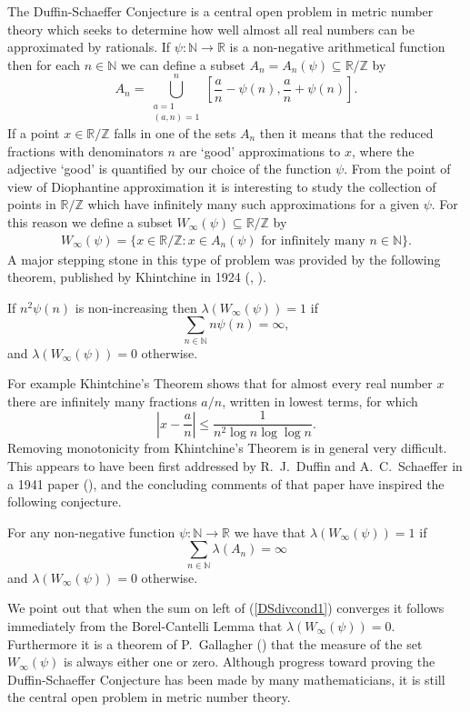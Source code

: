 \documentclass[12pt,reqno]{amsart}
\begin{document}
The Duffin-Schaeffer Conjecture is a central open problem in metric number theory which seeks to determine how well almost all real numbers can be approximated by rationals. If $\psi:{\mathbb{N}}{\rightarrow}{\mathbb{R}}$ is a non-negative arithmetical function then for each $n\in{\mathbb{N}}$ we can define a subset $A_n=A_n(\psi)\subseteq{\mathbb{R}}/{\mathbb{Z}}$ by
\begin{equation*}
A_n=\bigcup_{\substack{a=1\\(a,n)=1}}^n\left[\frac{a}{n}-\psi (n),\frac{a}{n}+\psi (n)\right].
\end{equation*}
If a point $x\in{\mathbb{R}}/{\mathbb{Z}}$ falls in one of the sets $A_n$ then it means that the reduced fractions with denominators $n$ are `good' approximations to $x$, where the adjective `good' is quantified by our choice of the function $\psi$. From the point of view of Diophantine approximation it is interesting to study the collection of points in ${\mathbb{R}}/{\mathbb{Z}}$ which have infinitely many such approximations for a given $\psi$. For this reason we define a subset $W_\infty(\psi)\subseteq{\mathbb{R}}/{\mathbb{Z}}$ by
\begin{align*}
W_\infty(\psi)=\{x\in{\mathbb{R}}/{\mathbb{Z}} :x\in A_n(\psi) \text{ for infinitely many }n\in{\mathbb{N}}\}.
\end{align*}
A major stepping stone in this type of problem was provided by the following theorem, published by Khintchine in 1924 (\cite{Khintchine1924}, \cite{Khintchine1926}).
\begin{KT}
If $n^2\psi(n)$ is non-increasing then $\lambda (W_\infty(\psi))=1$ if
\begin{equation*}
\sum_{n\in{\mathbb{N}}}n\psi (n)=\infty,
\end{equation*}
and $\lambda (W_\infty(\psi))=0$ otherwise.
\end{KT}
For example Khintchine's Theorem shows that for almost every real number $x$ there are infinitely many fractions $a/n$, written in lowest terms, for which
\[\left|x-\frac{a}{n}\right|\le\frac{1}{n^2\log n\log\log n}.\]
Removing monotonicity from Khintchine's Theorem is in general very difficult. This appears to have been first addressed by R.~J.~Duffin and A.~C.~Schaeffer in a 1941 paper (\cite{DuffinSchaeffer}), and the concluding comments of that paper have inspired the following conjecture.
\begin{DSC}
For any non-negative function $\psi:{\mathbb{N}}{\rightarrow}{\mathbb{R}}$ we have that $\lambda (W_\infty (\psi))=1$ if
\begin{equation}\label{DSdivcond1}
\sum_{n\in{\mathbb{N}}}\lambda (A_n)=\infty
\end{equation}
and $\lambda (W_\infty(\psi))=0$ otherwise.
\end{DSC}
We point out that when the sum on left of (\ref{DSdivcond1}) converges it follows immediately from the Borel-Cantelli Lemma that $\lambda (W_\infty(\psi))=0$. Furthermore it is a theorem of P.~Gallagher (\cite{Gallagher}) that the measure of the set $W_\infty(\psi)$ is always either one or zero. Although progress toward proving the Duffin-Schaeffer Conjecture has been made by many mathematicians, it is still the central open problem in metric number theory.
\end{document}
